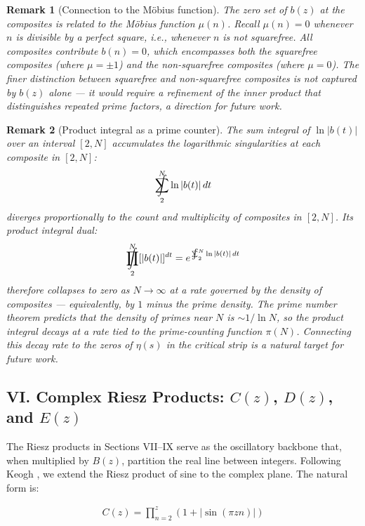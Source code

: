 \documentclass{article}
\newtheorem*{remark}{Remark}
\DeclareMathOperator*{\SumInt}{%
\mathchoice%
  {\ooalign{$\displaystyle\sum$\cr\hidewidth$\displaystyle\int$\hidewidth\cr}}
  {\ooalign{\raisebox{.14\height}{\scalebox{.7}{$\textstyle\sum$}}\cr\hidewidth$\textstyle\int$\hidewidth\cr}}
  {\ooalign{\raisebox{.2\height}{\scalebox{.6}{$\scriptstyle\sum$}}\cr$\scriptstyle\int$\cr}}
  {\ooalign{\raisebox{.2\height}{\scalebox{.6}{$\scriptstyle\sum$}}\cr$\scriptstyle\int$\cr}}
}
\DeclareMathOperator*{\ProdInt}{%
\mathchoice%
  {\ooalign{$\displaystyle\prod$\cr\hidewidth$\displaystyle\int$\hidewidth\cr}}
  {\ooalign{\raisebox{.14\height}{\scalebox{.7}{$\textstyle\prod$}}\cr\hidewidth$\textstyle\int$\hidewidth\cr}}
  {\ooalign{\raisebox{.2\height}{\scalebox{.6}{$\scriptstyle\prod$}}\cr$\scriptstyle\int$\cr}}
  {\ooalign{\raisebox{.2\height}{\scalebox{.6}{$\scriptstyle\prod$}}\cr$\scriptstyle\int$\cr}}
}
\begin{document}
\begin{remark}[Connection to the M\"{o}bius function]
The zero set of $b(z)$ at the composites is related to the M\"{o}bius function $\mu(n)$. Recall $\mu(n) = 0$ whenever $n$ is divisible by a perfect square, i.e., whenever $n$ is not squarefree. All composites contribute $b(n) = 0$, which encompasses both the squarefree composites (where $\mu = \pm 1$) and the non-squarefree composites (where $\mu = 0$). The finer distinction between squarefree and non-squarefree composites is not captured by $b(z)$ alone — it would require a refinement of the inner product that distinguishes repeated prime factors, a direction for future work.
\end{remark}

\begin{remark}[Product integral as a prime counter]
The sum integral of $\ln|b(t)|$ over an interval $[2, N]$ accumulates the logarithmic singularities at each composite in $[2, N]$:
\begin{align*}
\SumInt_2^N \ln|b(t)|\,dt
\end{align*}
diverges proportionally to the count and multiplicity of composites in $[2, N]$. Its product integral dual:
\begin{align*}
\ProdInt_2^N [|b(t)|]^{dt} = e^{\,\SumInt_2^N \ln|b(t)|\,dt}
\end{align*}
therefore collapses to zero as $N \to \infty$ at a rate governed by the density of composites — equivalently, by $1$ minus the prime density. The prime number theorem predicts that the density of primes near $N$ is $\sim 1/\ln N$, so the product integral decays at a rate tied to the prime-counting function $\pi(N)$. Connecting this decay rate to the zeros of $\eta(s)$ in the critical strip is a natural target for future work.
\end{remark}

\newpage
\newpage
\subsection{VI. Complex Riesz Products: $C(z)$, $D(z)$, and $E(z)$}
The Riesz products in Sections VII–IX serve as the oscillatory backbone that, when multiplied by $B(z)$, partition the real line between integers. Following Keogh \cite{keogh1966riesz}, we extend the Riesz product of sine to the complex plane. The natural form is:

\begin{align*}
	C(z) = \prod_{n=2}^{z} \left(1 + \left|\sin\left(\pi z n\right)\right|\right)
\end{align*}
\end{document}
